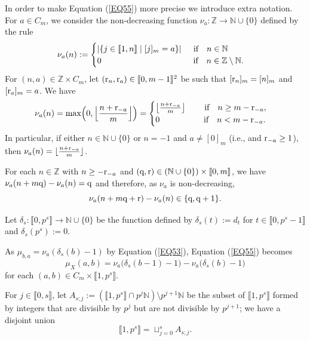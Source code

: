 \documentclass[11pt]{amsart}
\def\r{\textup{r}}
\def\q{\textup{q}}
\begin{document}
In order to make Equation (\ref{EQ55}) more precise we introduce extra notation. For $a\in C_m$, we consider the non-decreasing function $\nu_a:\mathbb Z\rightarrow\mathbb N\cup\{0\}$ defined by the rule 
$$\nu_a(n):=\begin{cases}|\{j\in\llbracket1,n\rrbracket\mid [j]_m=a\}|\quad\;\,\textup{if}\quad n\in\mathbb N\\
0\quad\quad\quad\quad\quad\quad\quad\quad\quad\quad\quad\textup{if}\quad n\in\mathbb Z\setminus\mathbb N.\end{cases}$$
For $(n,a)\in\mathbb Z\times C_m$, let $(\r_n,\r_a)\in\llbracket0,m-1\rrbracket^2$ be such that $[\r_n]_m=[n]_m$ and $[\r_a]_m=a$. We have
\[
\nu_a(n)=\max\Bigl(0,\Big\lfloor\frac{n+\r_{-a}}{m}\Big\rfloor\Bigr)=
\begin{cases}
\big\lfloor\frac{n+\r_{-a}}{m}\big\rfloor\quad\quad\;\textup{if}\quad n\ge m-\r_{-a},\\
0\quad\quad\quad\quad\quad\;\textup{if}\quad n<m-\r_{-a}.
\end{cases}
\]
In particular, if either $n\in\mathbb N\cup\{0\}$ or $n=-1$ and $a\neq [0]_m$ (i.e., and $\r_{-a}\ge 1$), then $\nu_a(n)=\lfloor\frac{n+\r_{-a}}{m}\rfloor$.

For each $n\in\mathbb Z$ with $n\ge -\r_{-a}$ and $(\q,\r)\in (\mathbb N\cup\{0\})\times\llbracket0,m\rrbracket$, we have 
$\nu_a(n+m\q)-\nu_a(n)=\q$ and therefore, as $\nu_a$ is non-decreasing, 
\begin{equation}\label{EQ56}
\nu_a(n+m\q+\r)-\nu_a(n)\in\{\q,\q+1\}.
\end{equation} 

Let $\delta_s:\llbracket0,p^s\rrbracket\rightarrow\mathbb N\cup\{0\}$ be the function defined by 
$\delta_s(t):=d_t$ for $t\in\llbracket0,p^s-1\rrbracket$ and
$\delta_s(p^s):=0$. 

As $\mu_{b,a}=\nu_a(\delta_s(b)-1)$ by Equation (\ref{EQ53}), Equation (\ref{EQ55}) becomes
\begin{equation}\label{EQ57}
\mu_X(a,b)=\nu_a\bigl(\delta_s(b-1)-1\bigr)-\nu_a\bigl(\delta_s(b)-1\bigr)
\end{equation}
for each $(a,b)\in C_m\times\llbracket1,p^s\rrbracket$. 

For $j\in\llbracket0,s\rrbracket$, let $A_{s;j}:=(\llbracket1,p^s\rrbracket\cap p^j\mathbb N)\setminus p^{j+1}\mathbb N$ be the subset of $\llbracket1,p^s\rrbracket$ formed by integers that are divisible by $p^j$ but are not divisible by $p^{j+1}$; we have a disjoint union 
$$\llbracket1,p^s\rrbracket=\sqcup_{j=0}^s A_{s;j}.$$
\end{document}
